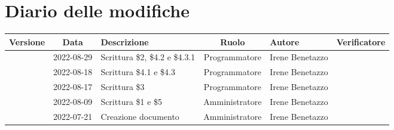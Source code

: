 \section*{Diario delle modifiche}
	\begin{center}
	\renewcommand{\arraystretch}{1.8} %
	\begin{longtable}{ |c|c|p{8em}|c|m{5em}|m{6em}| }
	\hline
	\textbf{Versione} & \textbf{Data} & \textbf{Descrizione} &  \textbf{Ruolo} &  \textbf{Autore} & \textbf{Verificatore}\\ %
	\hline %
	& 2022-08-29 & Scrittura \$2, \$4.2 e \$4.3.1 & Programmatore & Irene \newline Benetazzo & \\ 
	\hline
	& 2022-08-18 & Scrittura \$4.1 e \$4.3 & Programmatore & Irene \newline Benetazzo & \\ 
	\hline
	& 2022-08-17 & Scrittura \$3 & Programmatore & Irene \newline Benetazzo & \\ 
	\hline
	& 2022-08-09 & Scrittura \$1 e \$5 & Amministratore & Irene \newline Benetazzo & \\ 
	\hline
    & 2022-07-21 & Creazione documento & Amministratore & Irene \newline Benetazzo & \\ 
	\hline
	\end{longtable}
	\end{center}
	\newpage